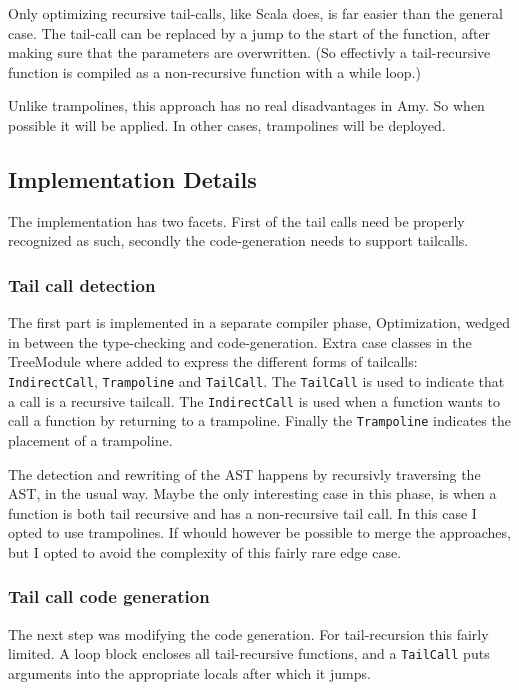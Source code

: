 Only optimizing recursive tail-calls, like Scala does, is far easier than the general case. The tail-call can be replaced by a jump to the start of the function, after making sure that the parameters are overwritten. (So effectivly a tail-recursive function is compiled as a non-recursive function with a while loop.)

Unlike trampolines, this approach has no real disadvantages in Amy. So when possible it will be applied. In other cases, trampolines will be deployed.

\subsection{Implementation Details}

The implementation has two facets. First of the tail calls need be properly recognized as such, secondly the code-generation needs to support tailcalls.

\subsubsection{Tail call detection}

The first part is implemented in a separate compiler phase, Optimization, wedged in between the type-checking and code-generation. Extra case classes in the TreeModule where added to express the different forms of tailcalls: \texttt{IndirectCall}, \texttt{Trampoline} and \texttt{TailCall}. The \texttt{TailCall} is used to indicate that a call is a recursive tailcall. The \texttt{IndirectCall} is used when a function wants to call a function by returning to a trampoline. Finally the \texttt{Trampoline} indicates the placement of a trampoline.

The detection and rewriting of the AST happens by recursivly traversing the AST, in the usual way. Maybe the only interesting case in this phase, is when a function is both tail recursive and has a non-recursive tail call. In this case I opted to use trampolines. If whould however be possible to merge the approaches, but I opted to avoid the complexity of this fairly rare edge case.

\subsubsection{Tail call code generation}

The next step was modifying the code generation. For tail-recursion this fairly limited. A loop block encloses all tail-recursive functions, and a \texttt{TailCall} puts arguments into the appropriate locals after which it jumps.

